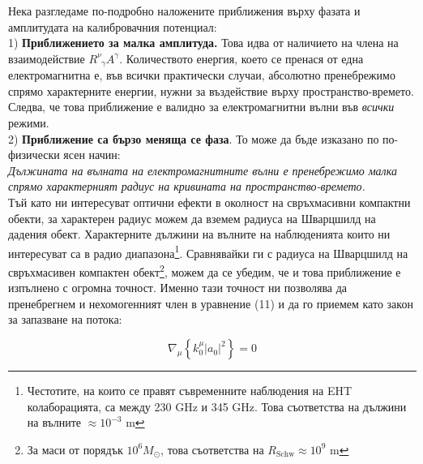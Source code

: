 Нека разгледаме по-подробно наложените приближения върху фазата и амплитудата на калибровачния потенциал:\\

1) \textbf{Приближението за малка амплитуда.} Това идва от наличието на члена на взаимодействие $R^\nu_{\,\,\,\gamma} A^\gamma$. Количеството енергия, което се пренася от една електромагнитна е, във всички практически случаи, абсолютно пренебрежимо спрямо характерните енергии, нужни за въздействие върху пространство-времето. Следва, че това приближение е валидно за електромагнитни вълни във \emph{всички} режими.\\

2) \textbf{Приближение са бързо меняща се фаза}. То може да бъде изказано по по-физически ясен начин:\\

\emph{Дължината на вълната на електромагнитните вълни е пренебрежимо малка спрямо характерният радиус на кривината на пространство-времето.}\\

Тъй като ни интересуват оптични ефекти в околност на свръхмасивни компактни обекти, за характерен радиус можем да вземем радиуса на Шварцшилд на дадения обект. Характерните дължини на вълните на наблюденията които ни интересуват са в радио диапазона\footnote{Честотите, на които се правят съвременните наблюдения на EHT колаборацията, са между 230 GHz и 345 GHz. Това съответства на дължини на вълните $\approx 10^{-3}$ m}. Сравнявайки ги с радиуса на Шварцшилд на свръхмасивен компактен обект\footnote{За маси от порядък $10^6 M_\odot$, това съответства на $R_{\text{Schw}}\approx 10^9$ m}, можем да се убедим, че и това приближение е изпълнено с огромна точност. Именно тази точност ни позволява да пренебрегнем и нехомогенният член в уравнение (11) и да го приемем като закон за запазване на потока:

\begin{equation}
		\nabla_\mu\left\{k_0^\mu |a_0|^2\right\} = 0
\end{equation}


